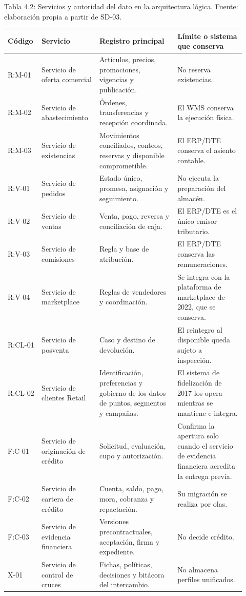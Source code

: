 \documentclass[11pt]{article}
\begin{document}
Tabla 4.2: Servicios y autoridad del dato en la arquitectura lógica. Fuente: elaboración propia a partir de SD-03.\par\nopagebreak
\begin{longtable}{@{}p{0.098\linewidth}p{0.236\linewidth}p{0.315\linewidth}p{0.275\linewidth}@{}}
\toprule Código & Servicio & Registro principal & Límite o sistema que conserva \\
\midrule\endhead\bottomrule\endlastfoot
R:M-01 & Servicio de oferta comercial & Artículos, precios, promociones, vigencias y publicación. & No reserva existencias. \\
R:M-02 & Servicio de abastecimiento & Órdenes, transferencias y recepción coordinada. & El WMS conserva la ejecución física. \\
R:M-03 & Servicio de existencias & Movimientos conciliados, conteos, reservas y disponible comprometible. & El ERP/DTE conserva el asiento contable. \\
R:V-01 & Servicio de pedidos & Estado único, promesa, asignación y seguimiento. & No ejecuta la preparación del almacén. \\
R:V-02 & Servicio de ventas & Venta, pago, reversa y conciliación de caja. & El ERP/DTE es el único emisor tributario. \\
R:V-03 & Servicio de comisiones & Regla y base de atribución. & El ERP/DTE conserva las remuneraciones. \\
R:V-04 & Servicio de marketplace & Reglas de vendedores y coordinación. & Se integra con la plataforma de marketplace de 2022, que se conserva. \\
R:CL-01 & Servicio de posventa & Caso y destino de devolución. & El reintegro al disponible queda sujeto a inspección. \\
R:CL-02 & Servicio de clientes Retail & Identificación, preferencias y gobierno de los datos de puntos, segmentos y campañas. & El sistema de fidelización de 2017 los opera mientras se mantiene e integra. \\
F:C-01 & Servicio de originación de crédito & Solicitud, evaluación, cupo y autorización. & Confirma la apertura solo cuando el servicio de evidencia financiera acredita la entrega previa. \\
F:C-02 & Servicio de cartera de crédito & Cuenta, saldo, pago, mora, cobranza y repactación. & Su migración se realiza por olas. \\
F:C-03 & Servicio de evidencia financiera & Versiones precontractuales, aceptación, firma y expediente. & No decide crédito. \\
X-01 & Servicio de control de cruces & Fichas, políticas, decisiones y bitácora del intercambio. & No almacena perfiles unificados. \\
\end{longtable}
\end{document}
